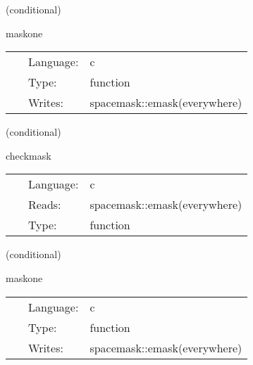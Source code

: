 \documentclass{article}
\begin{document}
\vspace{5mm}

   (conditional) 

\hspace{5mm} maskone 

\hspace{5mm}{\it set old style mask to one } 


\hspace{5mm}

 \begin{tabular*}{160mm}{cll} 
~ & Language:  & c \\ 
~ & Type:  & function \\ 
~ & Writes:  & spacemask::emask(everywhere) \\ 
\end{tabular*} 


\vspace{5mm}

   (conditional) 

\hspace{5mm} checkmask 

\hspace{5mm}{\it ensure that all mask values are legal } 


\hspace{5mm}

 \begin{tabular*}{160mm}{cll} 
~ & Language:  & c \\ 
~ & Reads:  & spacemask::emask(everywhere) \\ 
~ & Type:  & function \\ 
\end{tabular*} 


\vspace{5mm}

   (conditional) 

\hspace{5mm} maskone 

\hspace{5mm}{\it set mask to one } 


\hspace{5mm}

 \begin{tabular*}{160mm}{cll} 
~ & Language:  & c \\ 
~ & Type:  & function \\ 
~ & Writes:  & spacemask::emask(everywhere) \\ 
\end{tabular*} 
\end{document}
